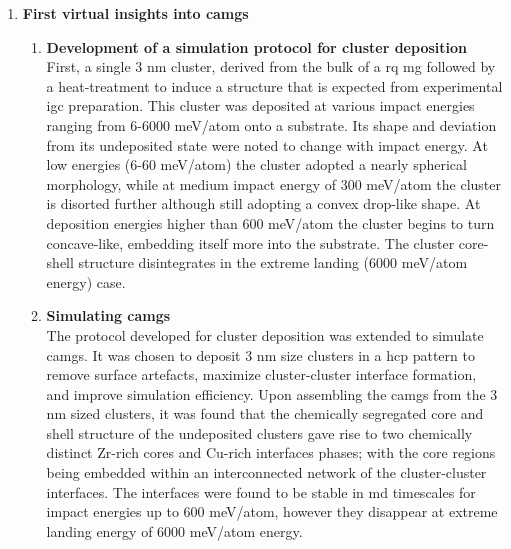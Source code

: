 \begin{enumerate}[leftmargin=*]
\item \textbf{First virtual insights into \gls{camg}s}
\begin{enumerate}[leftmargin=*]

\item \textbf{Development of a simulation protocol for cluster deposition} \\
First, a single 3 nm cluster, derived from the bulk of a \gls{rq} \gls{mg} followed by a heat-treatment to induce a structure that is expected from experimental \gls{igc} preparation. This cluster was deposited at various impact energies ranging from 6-6000 meV/atom onto a \cz substrate. Its shape and deviation from its undeposited state were noted to change with impact energy. At low energies (6-60 meV/atom) the cluster adopted a nearly spherical morphology, while at medium impact energy of 300 meV/atom the cluster is disorted further although still adopting a convex drop-like shape. At deposition energies higher than 600 meV/atom the cluster begins to turn concave-like, embedding itself more into the substrate. The cluster core-shell structure disintegrates in the extreme landing (6000 meV/atom energy) case. \par

\item \textbf{Simulating \cz \gls{camg}s} \\
The protocol developed for cluster deposition was extended to simulate \gls{camg}s. It was chosen to deposit 3 nm size \cz clusters in a \gls{hcp} pattern to remove surface artefacts, maximize cluster-cluster interface formation, and improve simulation efficiency. Upon assembling the \gls{camg}s from the 3 nm sized clusters, it was found that the chemically segregated core and shell structure of the undeposited clusters gave rise to two chemically distinct Zr-rich cores and Cu-rich interfaces phases; with the core regions being embedded within an interconnected network of the cluster-cluster interfaces. The interfaces were found to be stable in \gls{md} timescales for impact energies up to 600 meV/atom, however they disappear at extreme landing energy of 6000 meV/atom energy. \par


\end{enumerate}
\end{enumerate}
